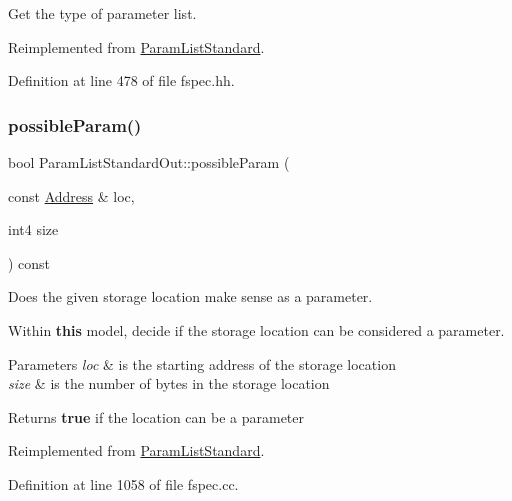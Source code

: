 Get the type of parameter list. 



Reimplemented from \mbox{\hyperlink{class_param_list_standard_a37193293ffb24b1206944e35ef64973c}{Param\+List\+Standard}}.



Definition at line 478 of file fspec.\+hh.

\mbox{\label{class_param_list_standard_out_a9c8b1c882536296945ff816d9e3f3600}} 
\subsubsection{\texorpdfstring{possibleParam()}{possibleParam()}}
{\footnotesize\ttfamily bool Param\+List\+Standard\+Out\+::possible\+Param (\begin{DoxyParamCaption}\item[{const \mbox{\hyperlink{class_address}{Address}} \&}]{loc,  }\item[{int4}]{size }\end{DoxyParamCaption}) const\hspace{0.3cm}{\ttfamily [virtual]}}



Does the given storage location make sense as a parameter. 

Within {\bfseries{this}} model, decide if the storage location can be considered a parameter. 
\begin{DoxyParams}{Parameters}
{\em loc} & is the starting address of the storage location \\
\hline
{\em size} & is the number of bytes in the storage location \\
\hline
\end{DoxyParams}
\begin{DoxyReturn}{Returns}
{\bfseries{true}} if the location can be a parameter 
\end{DoxyReturn}


Reimplemented from \mbox{\hyperlink{class_param_list_standard_a22a2afd938c503357fac9d330eb89858}{Param\+List\+Standard}}.



Definition at line 1058 of file fspec.\+cc.

\mbox{\label{class_param_list_standard_out_a6ca5a4b571dad6ad5378afda6ac84e0c}} 
